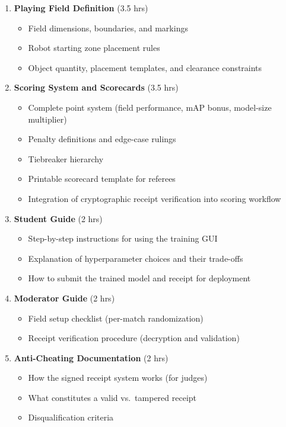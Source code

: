 \documentclass[a4]{article}
\begin{document}
\begin{enumerate}[leftmargin=*]
    \item \textbf{Playing Field Definition} (3.5 hrs)
    \begin{itemize}
        \item Field dimensions, boundaries, and markings
        \item Robot starting zone placement rules
        \item Object quantity, placement templates, and clearance constraints
    \end{itemize}

    \item \textbf{Scoring System and Scorecards} (3.5 hrs)
    \begin{itemize}
        \item Complete point system (field performance, mAP bonus, model-size multiplier)
        \item Penalty definitions and edge-case rulings
        \item Tiebreaker hierarchy
        \item Printable scorecard template for referees
        \item Integration of cryptographic receipt verification into scoring workflow
    \end{itemize}

    \item \textbf{Student Guide} (2 hrs)
    \begin{itemize}
        \item Step-by-step instructions for using the training GUI
        \item Explanation of hyperparameter choices and their trade-offs
        \item How to submit the trained model and receipt for deployment
    \end{itemize}

    \item \textbf{Moderator Guide} (2 hrs)
    \begin{itemize}
        \item Field setup checklist (per-match randomization)
        \item Receipt verification procedure (decryption and validation)
    \end{itemize}

    \item \textbf{Anti-Cheating Documentation} (2 hrs)
    \begin{itemize}
        \item How the signed receipt system works (for judges)
        \item What constitutes a valid vs.\ tampered receipt
        \item Disqualification criteria
    \end{itemize}


\end{enumerate}
\end{document}
